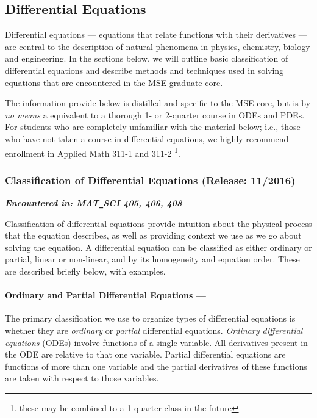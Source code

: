 \subsection{Differential Equations} \label{sec:DiffEQ}



Differential equations --- equations that relate functions with their derivatives --- are central to the description of natural phenomena in physics, chemistry, biology and engineering. In the sections below, we will outline basic classification of differential equations and describe methods and techniques used in solving equations that are encountered in the MSE graduate core.

The information provide below is distilled and specific to the MSE core, but is by \emph{no means} a equivalent to a thorough 1- or 2-quarter course in ODEs and PDEs. For students who are completely unfamiliar with the material below; i.e., those who have not taken a course in differential equations, we highly recommend enrollment in Applied Math 311-1 and 311-2 \footnote{these may be combined to a 1-quarter class in the future}.

	\subsubsection{Classification of Differential Equations \hfill (Release: 11/2016)}
	
	\textit{\textbf{Encountered in: MAT\texttt{\_}SCI 405, 406, 408}} 
	
		Classification of differential equations provide intuition about the physical process that the equation describes, as well as providing context we use as we go about solving the equation. A differential equation can be classified as either ordinary or partial, linear or non-linear, and by its homogeneity and equation order. These are described briefly below, with examples.
		
		\paragraph{Ordinary and Partial Differential Equations ---} The primary classification we use to organize types of differential equations is whether they are \textit{ordinary} or \textit{partial} differential equations. \emph{Ordinary differential equations} (ODEs) involve functions of a single variable. All derivatives present in the ODE are relative to that one variable. Partial differential equations are functions of more than one variable and the partial derivatives of these functions are taken with respect to those variables.
			
